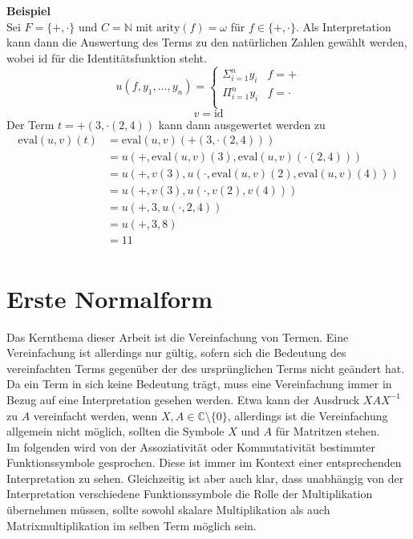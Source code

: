 \documentclass{article}
\begin{document}
\textbf{Beispiel}\\
Sei $F = \{+, \cdot \}$ und $C = \mathbb{N}$ mit $\mathrm{arity}(f) = \omega$ für $f\in \{+, \cdot \}$.
Als Interpretation kann dann die Auswertung des Terms zu den natürlichen Zahlen gewählt werden, wobei $\mathrm{id}$ für die Identitätsfunktion steht.
$$u(f, y_1, \dots, y_{n}) = \begin{cases}
\Sigma_{i = 1}^{n} y_i & f = +\\
\Pi_{i = 1}^{n} y_i & f = \cdot\\
\end{cases}$$
$$v = \mathrm{id}$$
Der Term $t = +(3, \cdot(2, 4))$ kann dann ausgewertet werden zu 
\begin{equation*}
    \begin{split}
    \mathrm{eval}(u, v)(t) &= \mathrm{eval}(u, v)(+(3, \cdot(2, 4))) \\
    &= u(+, \mathrm{eval}(u, v)(3), \mathrm{eval}(u, v)(\cdot(2, 4))) \\
    &= u(+, v(3), u(\cdot, \mathrm{eval}(u, v)(2), \mathrm{eval}(u, v)(4))) \\
    &= u(+, v(3), u(\cdot, v(2), v(4))) \\
    &= u(+, 3, u(\cdot, 2, 4)) \\
    &= u(+, 3, 8) \\
    &= 11 \\
    \end{split}
\end{equation*}

\section {Erste Normalform}

Das Kernthema dieser Arbeit ist die Vereinfachung von Termen. Eine Vereinfachung ist allerdings nur gültig, sofern sich die Bedeutung des vereinfachten Terms gegenüber der des ursprünglichen Terms nicht geändert hat. Da ein Term in sich keine Bedeutung trägt, muss eine Vereinfachung immer in Bezug auf eine Interpretation gesehen werden. Etwa kann der Ausdruck $X A X^{-1}$ zu $A$ vereinfacht werden, wenn $X, A \in \mathbb{C} \setminus \{0\}$, allerdings ist die Vereinfachung allgemein nicht möglich, sollten die Symbole $X$ und $A$ für Matritzen stehen. \\
Im folgenden wird von der Assoziativität oder Kommutativität bestimmter Funktionssymbole gesprochen. Diese ist immer im Kontext einer entsprechenden Interpretation zu sehen. Gleichzeitig ist aber auch klar, dass unabhängig von der Interpretation verschiedene Funktionssymbole die Rolle der Multiplikation übernehmen müssen, sollte sowohl skalare Multiplikation als auch Matrixmultiplikation im selben Term möglich sein. \\
\end{document}
